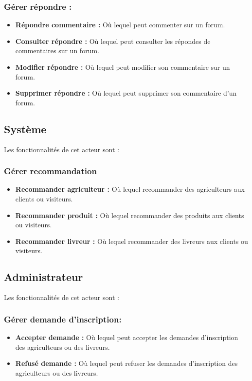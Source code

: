 \documentclass[16pt,fleqn]{article} %
\begin{document}
\subsubsection{Gérer répondre :}
    \begin{itemize}
        \item \textbf{Répondre commentaire :} Où lequel peut commenter sur un forum.
        \item \textbf{Consulter répondre :} Où lequel peut consulter les répondes de commentaires sur un forum.
        \item \textbf{Modifier répondre :} Où lequel peut modifier son commentaire sur un forum.
        \item \textbf{Supprimer répondre :} Où lequel peut supprimer son commentaire d'un forum.
    \end{itemize}  
    
\subsection{Système}
Les fonctionnalités de cet acteur sont :
\subsubsection{Gérer recommandation}
\begin{itemize}
    \item  \textbf{Recommander agriculteur : }
    Où lequel recommander des agriculteurs aux clients ou visiteurs.
    \item  \textbf{Recommander produit : }
    Où lequel recommander des produits aux clients ou visiteurs.
    \item  \textbf{Recommander livreur : }
    Où lequel recommander des livreurs aux clients ou visiteurs.
\end{itemize}

\subsection{Administrateur}

Les fonctionnalités de cet acteur sont :

\subsubsection{Gérer demande d'inscription:}
\begin{itemize}
    \item \textbf{Accepter demande :} Où lequel peut accepter les demandes d'inscription des agriculteurs ou des livreurs.
    \item \textbf{Refusé demande :} Où lequel peut refuser les demandes d'inscription des agriculteurs ou des livreurs.
\end{itemize}
\end{document}
